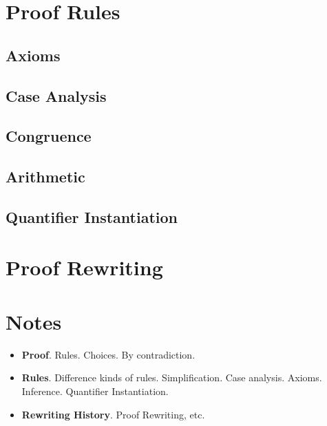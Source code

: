 \section{Proof Rules}

\subsection{Axioms}
\subsection{Case Analysis}
\subsection{Congruence}
\subsection{Arithmetic}
\subsection{Quantifier Instantiation}

\section{Proof Rewriting}

\section{Notes}
\begin{itemize}
\item {\bf Proof}.  Rules.  Choices.  By contradiction.
\item {\bf Rules}.  Difference kinds of rules.  Simplification.  Case analysis.  Axioms.  Inference.  Quantifier Instantiation.
\item {\bf Rewriting History}.  Proof Rewriting, etc.
\end{itemize}